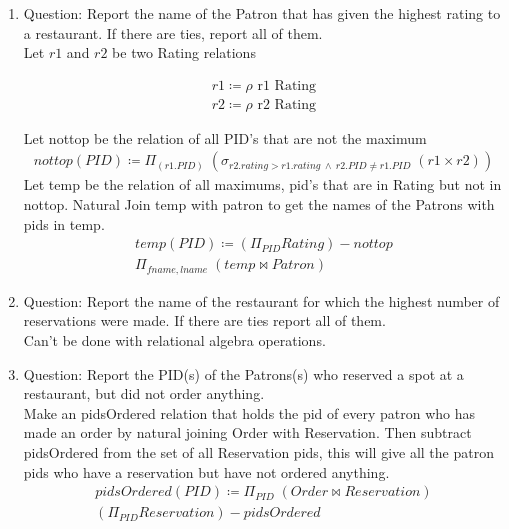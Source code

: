 \documentclass{article}
\begin{document}
\begin{enumerate}
    \item %
    Question: Report the name of the Patron that has given the highest rating to a restaurant. If there are ties,
report all of them.\\
    
        Let $r1$ and $r2$ be two Rating relations
        
        \begin{align}
        r1\coloneqq \rho \text{  r1 Rating}  \\
        r2\coloneqq \rho \text{  r2 Rating}
		\end{align}     
		
		 Let nottop be the relation of all PID's that are not the maximum
		\begin{align}
        nottop(PID)\coloneqq \Pi_{(r1.PID)}\;(\sigma_{r2.rating > r1.rating \: \wedge \: r2.PID  \neq r1.PID}\;(r1 \times r2))
		\end{align} 
		Let temp be the relation of all maximums, pid's that are in Rating but not in nottop. Natural Join temp with patron to get the names of the Patrons with pids in temp.
		\begin{align}
        temp(PID)\coloneqq 	(\Pi_{PID} Rating) - nottop\\
        \Pi_{fname,lname}\;(temp \bowtie Patron)
		\end{align} 
		
       
    \item %
        Question: Report the name of the restaurant for which the highest number of reservations were made. If there
are ties report all of them.\\

        Can't be done with relational algebra operations. 
    \item %
        Question: Report the PID(s) of the Patrons(s) who reserved a spot at a restaurant, but did not order anything.\\
        
        Make an pidsOrdered relation that holds the pid of every patron who has made an order by natural joining Order with Reservation. Then subtract pidsOrdered from the set of all Reservation pids, this will give all the patron pids who have a reservation but have not ordered anything.
        \begin{align}
        pidsOrdered(PID)\coloneqq \Pi_{PID}\;(Order \bowtie Reservation)\\
        (\Pi_{PID} Reservation) - pidsOrdered
		\end{align} 
       

\end{enumerate}
\end{document}
